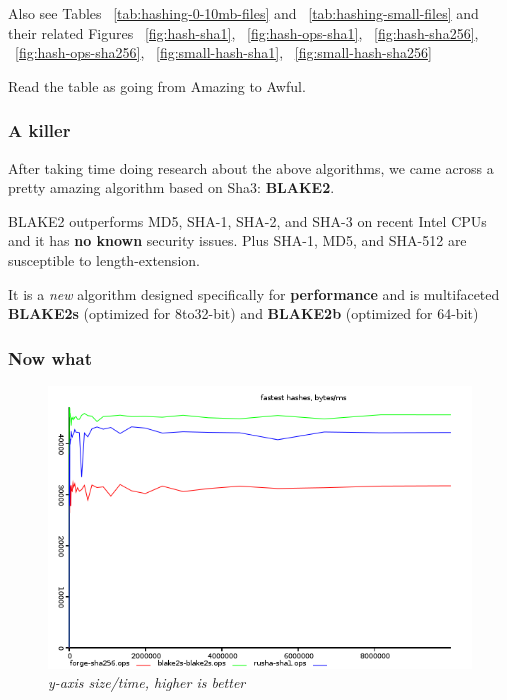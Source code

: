 Also see Tables ~\ref{tab:hashing-0-10mb-files} and ~\ref{tab:hashing-small-files}
and their related Figures ~\ref{fig:hash-sha1}, ~\ref{fig:hash-ops-sha1}, ~\ref{fig:hash-sha256}, ~\ref{fig:hash-ops-sha256}, ~\ref{fig:small-hash-sha1}, ~\ref{fig:small-hash-sha256}

Read the table as going from Amazing to Awful.

\subsubsection{A killer}

After taking time doing research about the above algorithms, we came across a pretty amazing algorithm based on Sha3: \textbf{BLAKE2}\cite{Guo2014AnalysisBLAKE2,SaarinenM-J.2015TheMAC}.

BLAKE2 outperforms MD5, SHA-1, SHA-2, and SHA-3 on recent Intel CPUs and it has \textbf{no known} security issues. Plus SHA-1, MD5, and SHA-512 are susceptible to length-extension.

It is a \textit{new} algorithm designed specifically for \textbf{performance} and is multifaceted \textbf{BLAKE2s} (optimized for 8to32-bit) and \textbf{BLAKE2b} (optimized for 64-bit)

\subsubsection{Now what}
\begin{figure}[htpb]
\centering
\caption{\small \sl y-axis size/time, higher is better
\label{fig:hash-ops-best}}
\includegraphics[scale=0.6]{annexes/graphs/hash-ops-best.png}
\end{figure} 

